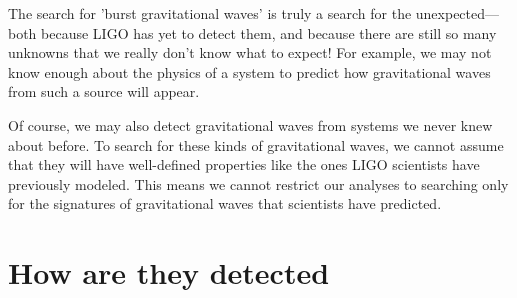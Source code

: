 The search for 'burst gravitational waves' is truly a search for the unexpected—both because LIGO has yet to detect them, and because there are still so many unknowns that we really don’t know what to expect! For example, we may not know enough about the physics of a system to predict how gravitational waves from such a source will appear. 

Of course, we may also detect gravitational waves from systems we never knew about before. To search for these kinds of gravitational waves, we cannot assume that they will have well-defined properties like the ones LIGO scientists have previously modeled. This means we cannot restrict our analyses to searching only for the signatures of gravitational waves that scientists have predicted.
\section{How are they detected}

